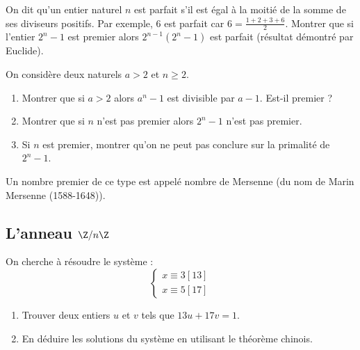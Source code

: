 \begin{exercice}
On dit qu'un entier naturel $n$ est parfait s'il est égal à la moitié de la somme de ses diviseurs positifs. 
Par exemple, $6$ est parfait car $6=\frac{1+2+3+6}{2}$. 
Montrer que si l'entier $2^{n}-1$ est premier alors $2^{n-1}(2^{n}-1)$ est parfait (résultat démontré par Euclide). 
\end{exercice}

\begin{exercice}
On considère deux naturels $a > 2$ et $n\geqslant2$. 
\begin{enumerate}
 \item Montrer que si $a>2$ alors $a^{n}-1$ est divisible par $a-1$. Est-il premier ? 
 \item Montrer que si $n$ n'est pas premier alors $2^{n}-1$ n'est pas premier. 
 \item Si $n$ est premier, montrer qu'on ne peut pas conclure sur la primalité de $2^{n}-1$. 
\end{enumerate}
Un nombre premier de ce type est appelé nombre de Mersenne (du nom de Marin Mersenne (1588-1648)). 
\end{exercice}

\subsection{L'anneau \texorpdfstring{$\Z/n\Z$}{Z/nZ}}

\begin{exercice}
On cherche à résoudre le système :
\[\begin{cases}x\equiv3[13]\\ x\equiv5[17]\end{cases}\]
\begin{enumerate}
 \item[a)] Trouver deux entiers $u$ et $v$ tels que $13u+17v=1$. 
 \item[b)] En déduire les solutions du système en utilisant le théorème chinois. 
\end{enumerate}
\end{exercice}

